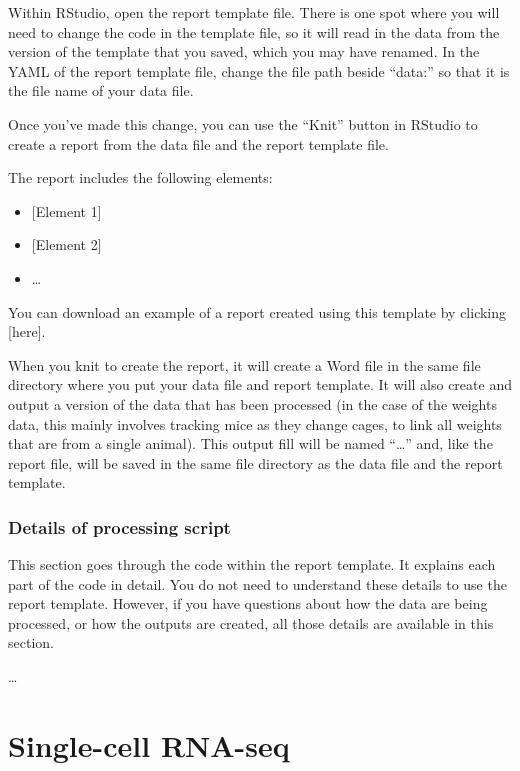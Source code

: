 \documentclass[
]{book}
\providecommand{\tightlist}{%
  \setlength{\itemsep}{0pt}\setlength{\parskip}{0pt}}
\begin{document}
Within RStudio, open the report template file. There is one spot where you will
need to change the code in the template file, so it will read in the data from
the version of the template that you saved, which you may have renamed.
In the YAML of the report template file, change the file path beside ``data:''
so that it is the file name of your data file.

Once you've made this change, you can use the ``Knit'' button in RStudio to
create a report from the data file and the report template file.

The report includes the following elements:

\begin{itemize}
\tightlist
\item
  {[}Element 1{]}
\item
  {[}Element 2{]}
\item
  \ldots{}
\end{itemize}

You can download an example of a report created using this template by
clicking {[}here{]}.

When you knit to create the report, it will create a Word file in the
same file directory where you put your data file and report template.
It will also create and output a version of the data that has been
processed (in the case of the weights data, this mainly involves
tracking mice as they change cages, to link all weights that are from
a single animal). This output fill will be named ``\ldots{}'' and, like
the report file, will be saved in the same file directory as the
data file and the report template.

\hypertarget{details-of-processing-script-2}{%
\subsection{Details of processing script}\label{details-of-processing-script-2}}

This section goes through the code within the report template. It
explains each part of the code in detail. You do not need to understand
these details to use the report template. However, if you have questions
about how the data are being processed, or how the outputs are created,
all those details are available in this section.

\ldots{}

\hypertarget{single-cell-rna-seq}{%
\chapter{Single-cell RNA-seq}\label{single-cell-rna-seq}}
\end{document}
